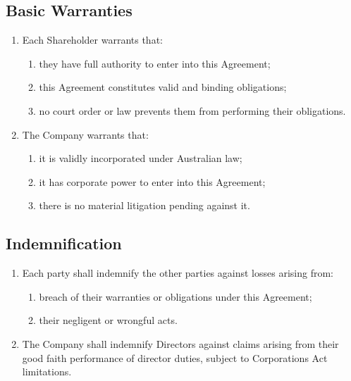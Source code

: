 \subsection{Basic Warranties}
\begin{enumerate}[label=(\alph*)]
\item Each Shareholder warrants that:
    \begin{enumerate}[label=(\roman*)]
    \item they have full authority to enter into this Agreement;
    \item this Agreement constitutes valid and binding obligations;
    \item no court order or law prevents them from performing their obligations.
    \end{enumerate}
\item The Company warrants that:
    \begin{enumerate}[label=(\roman*)]
    \item it is validly incorporated under Australian law;
    \item it has corporate power to enter into this Agreement;
    \item there is no material litigation pending against it.
    \end{enumerate}
\end{enumerate}

\subsection{Indemnification}
\begin{enumerate}[label=(\alph*)]
\item Each party shall indemnify the other parties against losses arising from:
    \begin{enumerate}[label=(\roman*)]
    \item breach of their warranties or obligations under this Agreement;
    \item their negligent or wrongful acts.
    \end{enumerate}
\item The Company shall indemnify Directors against claims arising from their good faith performance of director duties, subject to Corporations Act limitations.
\end{enumerate} 